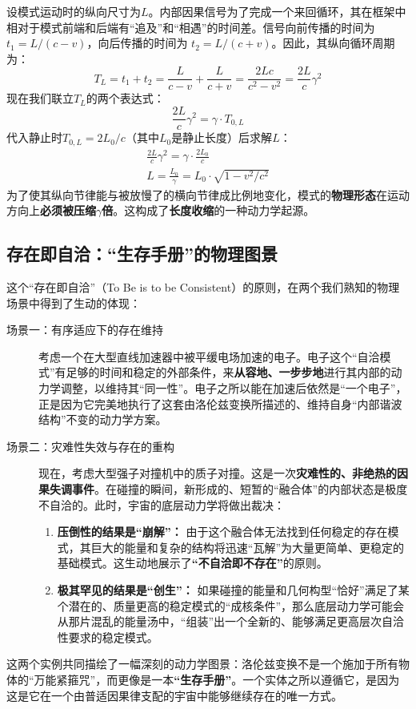 \documentclass[12pt, a4paper]{article}
\begin{document}
设模式运动时的纵向尺寸为$L$。内部因果信号为了完成一个来回循环，其在框架中相对于模式前端和后端有``追及''和``相遇''的时间差。信号向前传播的时间为 $t_1 = L / (c-v)$，向后传播的时间为 $t_2 = L / (c+v)$。因此，其纵向循环周期为：
\begin{equation}
    T_L = t_1 + t_2 = \frac{L}{c-v} + \frac{L}{c+v} = \frac{2Lc}{c^2-v^2} = \frac{2L}{c}\gamma^2
\end{equation}
现在我们联立$T_L$的两个表达式：
\begin{equation}
    \frac{2L}{c}\gamma^2 = \gamma \cdot T_{0,L}
\end{equation}
代入静止时$T_{0,L}=2L_0/c$（其中$L_0$是静止长度）后求解$L$：
\begin{gather}
    \frac{2L}{c}\gamma^2 = \gamma \cdot \frac{2L_0}{c} \\
    L = \frac{L_0}{\gamma} = L_0 \cdot \sqrt{1 - v^2/c^2}
\end{gather}
为了使其纵向节律能与被放慢了的横向节律成比例地变化，模式的\textbf{物理形态}在运动方向上\textbf{必须被压缩$\gamma$倍}。这构成了\textbf{长度收缩}的一种动力学起源。

\subsection{存在即自洽：``生存手册''的物理图景}
这个``存在即自洽''（To Be is to be Consistent）的原则，在两个我们熟知的物理场景中得到了生动的体现：
\begin{description}
\item[场景一：有序适应下的存在维持]
考虑一个在大型直线加速器中被平缓电场加速的电子。电子这个``自洽模式''有足够的时间和稳定的外部条件，来\textbf{从容地、一步步地}进行其内部的动力学调整，以维持其``同一性''。电子之所以能在加速后依然是``一个电子''，正是因为它完美地执行了这套由洛伦兹变换所描述的、维持自身``内部谐波结构''不变的动力学方案。
\item[场景二：灾难性失效与存在的重构]
现在，考虑大型强子对撞机中的质子对撞。这是一次\textbf{灾难性的、非绝热的因果失调事件}。在碰撞的瞬间，新形成的、短暂的``融合体''的内部状态是极度不自洽的。此时，宇宙的底层动力学将做出裁决：
\begin{enumerate}
\item \textbf{压倒性的结果是``崩解''：} 由于这个融合体无法找到任何稳定的存在模式，其巨大的能量和复杂的结构将迅速``瓦解''为大量更简单、更稳定的基础模式。这生动地展示了\textbf{``不自洽即不存在''}的原则。
\item \textbf{极其罕见的结果是``创生''：} 如果碰撞的能量和几何构型``恰好''满足了某个潜在的、质量更高的稳定模式的``成核条件''，那么底层动力学可能会从那片混乱的能量汤中，``组装''出一个全新的、能够满足更高层次自洽性要求的稳定模式。
\end{enumerate}
\end{description}
这两个实例共同描绘了一幅深刻的动力学图景：洛伦兹变换不是一个施加于所有物体的``万能紧箍咒''，而更像是一本\textbf{``生存手册''}。一个实体之所以遵循它，是因为这是它在一个由普适因果律支配的宇宙中能够继续存在的唯一方式。
\end{document}

